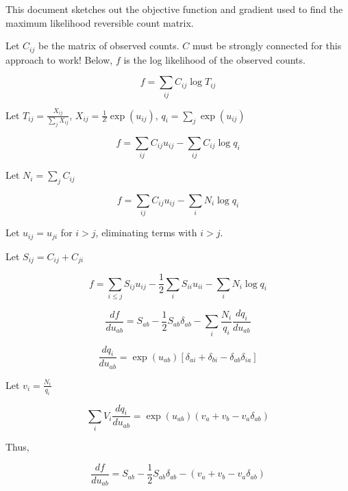 \documentclass[12pt]{article}
\begin{document}
This document sketches out the objective function and gradient used to find the maximum likelihood reversible count matrix.  

Let $C_{ij}$ be the matrix of observed counts.  $C$ must be strongly connected for this approach to work!  Below, $f$ is the log likelihood of the observed counts.


$$f = \sum_{ij} C_{ij} \log T_{ij}$$

Let $T_{ij} = \frac{X_{ij}}{\sum_j X_{ij}}$, $X_{ij} = \frac{1}{Z} \exp(u_{ij})$, $q_i = \sum_j \exp(u_{ij})$

$$f = \sum_{ij} C_{ij} u_{ij} - \sum_{ij} C_{ij} \log q_i$$

Let $N_i = \sum_j C_{ij}$

$$f = \sum_{ij} C_{ij} u_{ij} - \sum_{i} N_i \log q_i$$

Let $u_{ij} = u_{ji}$ for $i > j$, eliminating terms with $i>j$.

Let $S_{ij} = C_{ij} + C_{ji}$

$$f = \sum_{i \le j} S_{ij} u_{ij} - \frac{1}{2} \sum_i S_{ii} u_{ii} - \sum_i N_i \log q_i$$


$$\frac{df}{du_{ab}} = S_{ab}  - \frac{1}{2} S_{ab} \delta_{ab} - \sum_i \frac{N_i}{q_i} \frac{dq_i}{du_{ab}}$$

$$\frac{dq_i}{du_{ab}} = \exp(u_{ab}) [\delta_{ai} + \delta_{bi} - \delta_{ab} \delta_{ia}]$$

Let $v_i = \frac{N_i}{q_i}$

$$ \sum_i V_i \frac{dq_i}{du_{ab}} = \exp(u_{ab}) (v_a + v_b - v_a \delta_{ab})$$ 

Thus,

$$\frac{df}{du_{ab}} = S_{ab}  - \frac{1}{2} S_{ab} \delta_{ab} - (v_a + v_b - v_a \delta_{ab})$$
\end{document}

